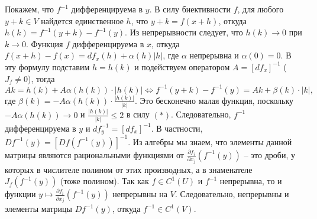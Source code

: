 \begin{myproof}
	\vspace{5pt}
	Покажем, что $f^{-1}$ дифференцируема в $y$.
	В силу биективности $f$, для любого $y + k \in V$ найдется единственное $h$, что $y+k = f(x+h)$, откуда $h(k) = f^{-1}(y+k) - f^{-1}(y)$. 
	Из непрерывности следует, что $h(k) \to 0$ при $k \to 0$.
	Функция $f$ дифференцируема в $x$, откуда $f(x+h) - f(x) = df_x(h) + \alpha(h) |h|$, где $\alpha$ непрерывна и $\alpha(0) = 0$.
	В эту формулу подставим $h = h(k)$ и подействуем оператором $A = [df_x]^{-1}$ ($J_f \neq 0$), тогда 
	\[ Ak = h(k) + A \alpha (h(k)) \cdot |h(k)| \iff f^{-1}(y+k) - f^{-1}(y) = Ak + \beta(k) \cdot |k|, \]
	где $\beta(k) = -A \alpha (h(k)) \cdot \frac{|h(k)|}{|k|}$. 
	Это бесконечно малая функция, поскольку $-A \alpha (h(k)) \to 0$ и $\frac{|h(k)|}{|k|} \leq 2$ в силу $(*)$. 
	Следовательно, $f^{-1}$ дифференцируема в $y$ и $df^{-1}_y = [df_x]^{-1}$.
	В частности, $Df^{-1}(y) = [Df(f^{-1}(y))]^{-1}$.
	Из алгебры мы знаем, что элементы данной матрицы являются рациональными функциями от $\frac{\partial f_i}{\partial x_j}(f^{-1}(y))$ -- это дроби, у которых в числителе полином от этих производных, а в знаменателе $J_f(f^{-1}(y))$ (тоже полином).
	Так как $f \in C^1(U)$ и $f^{-1}$ непрерывна, то и функции $y \mapsto \frac{\partial f_i}{\partial x_j}(f^{-1}(y))$ непрерывны на $V$.
	Следовательно, непрерывны и элементы матрицы $Df^{-1}(y)$, откуда $f^{-1} \in C^1(V)$.
\end{myproof}